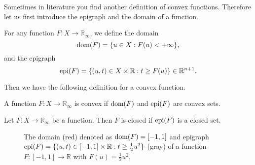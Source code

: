     Sometimes in literature you find another definition of convex functions. Therefore let us first introduce the epigraph and the domain of a function.

    \begin{definition} %
    \label{def:domain_epigraph}

        For any function $F: X \longrightarrow \mathbb{R}_{\infty}$, we define the domain
            \begin{equation}
                \textnormal{dom}(F) = \{ u \in X : F(u) < +\infty \},
                \label{eq:domain}
            \end{equation}
        and the epigraph
            \begin{equation}
                \textnormal{epi}(F) = \{ (u, t) \in X \times \mathbb{R}: t \ge F(u) \} \in \mathbb{R}^{n+1}.
                \label{eq:epigraph}
            \end{equation}
    \end{definition}

    Then we have the following definition for a convex function.

    \begin{definition} %
    \label{def:convex_function_else}

        A function $F: X \longrightarrow \mathbb{R}_{\infty}$ is convex if $\textnormal{dom}(F)$ and $\textnormal{epi}(F)$ are convex sets.

    \end{definition}

    \begin{definition} %
    \label{def:closed_function}

        Let $F: X \longrightarrow \mathbb{R}_{\infty}$ be a function. Then $F$ is closed if $\textnormal{epi}(F)$ is a closed set.

    \end{definition}

    \begin{figure}[ht]
        \centering
        \label{fig:domain_epigraph}
        \caption{The domain (red) denoted as $\textnormal{dom}(F) = [-1, 1]$ and epigraph \\$\textnormal{epi}(F) = \{(u, t) \in [-1, 1] \times \mathbb{R} : t \ge \frac{1}{2}u^{2}\}$ (gray) of a function $F: [-1, 1] \longrightarrow \mathbb{R}$ with $F(u) = \frac{1}{2}u^{2}$.}
    \end{figure}

